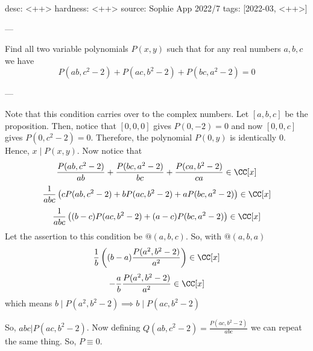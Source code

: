 desc: <++>
hardness: <++>
source: Sophie App 2022/7
tags: [2022-03, <++>]

---

Find all two variable polynomials $P(x,y)$ such that for any real numbers $a,b,c$ we have 
\[P(ab,c^2 -2) + P(ac,b^2-2) + P(bc,a^2-2) = 0\]

---

Note that this condition carries over to the complex numbers. Let $[a,b,c]$ be the proposition. Then, notice that $[0,0,0]$ gives $P(0,-2) = 0$ and now $[0,0,c]$ gives $P(0,c^2-2) = 0$.
Therefore, the polynomial $P(0,y)$ is identically 0. Hence, $x \mid P(x,y)$. Now notice that
\[
\frac{P(ab,c^2-2)}{ab} + \frac{P(bc,a^2-2)}{bc} + \frac{P(ca,b^2-2)}{ca} \in \CC[x]
\]
\[
\frac1{abc} \left( cP(ab,c^2 -2) + bP(ac,b^2-2) + aP(bc,a^2-2)\right) \in \CC[x]
\]
\[
\frac1{abc} \left((b-c)P(ac,b^2-2) + (a-c)P(bc,a^2-2)\right) \in \CC[x]
\]
Let the assertion to this condition be $@(a,b,c)$. So, with $@(a,b,a)$
\[
\frac1{b} \left((b-a) \frac{P(a^2,b^2-2)}{a^2}\right) \in \CC[x]
\]
\[-\frac{a}{b} \frac{P(a^2,b^2-2)}{a^2} \in \CC[x]\]
which means $b \mid P(a^2, b^2-2) \implies b \mid P(ac,b^2-2)$

So, $abc | P(ac,b^2-2)$. Now defining $Q(ab,c^2-2) =
\frac{P(ac,b^2-2)}{abc}$ we can repeat the same thing. So, $P \equiv 0$.
